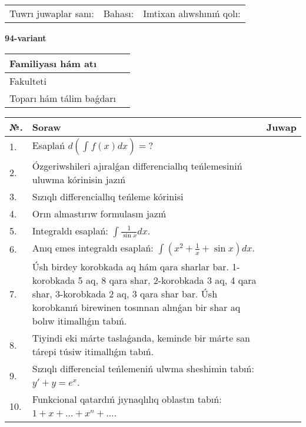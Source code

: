 \documentclass{article}
\begin{document}
\vspace{1cm}

\begin{tabular}{ c c c }
Tuwrı juwaplar sanı: \underline{\hspace{2cm}} & Bahası: \underline{\hspace{2cm}} & Imtixan alıwshınıń qolı: \underline{\hspace{2cm}} \\
\end{tabular}

\newpage

\begin{center}\textbf{94-variant}\end{center}

\bgroup
\def\arraystretch{1.5}
\begin{tabular}{ |m{6cm}|m{10cm}| }
  \hline
  Familiyası hám atı & \\
  \hline
  Fakulteti &\\
  \hline
  Toparı hám tálim baǵdarı & \\
  \hline
\end{tabular}
\egroup

\vspace{0.5cm}

\bgroup
\def\arraystretch{2}
\begin{tabular}{ |l|m{8cm}|m{7cm}| }
  \hline
  №. & Soraw & Juwap \\
  \hline
  1. & Esaplań $\displaystyle d\left( \int_{}^{}{f(x)dx} \right) = ?$ &  \\
  \hline
  2. & Ózgeriwshileri ajıralǵan differenciallıq teńlemesiniń uluwma kórinisin jazıń &  \\
  \hline
  3. & Sızıqlı differenciallıq teńleme kórinisi &  \\
  \hline
  4. & Orın almastırıw formulasın jazıń &  \\
  \hline
  5. & Integraldı esaplań: $\displaystyle\int {\frac{1}{\sin x}dx} $. &  \\
  \hline
  6. & Anıq emes integraldı esaplań: $\displaystyle\int(x^{2}+\frac{1}{x} + \sin x)dx$. &  \\
  \hline
  7. & Úsh birdey korobkada aq hám qara sharlar bar. 1-korobkada 5 aq, 8 qara shar, 2-korobkada 3 aq, 4 qara shar, 3-korobkada 2 aq, 3 qara shar bar. Úsh korobkanıń birewinen tosınnan alınǵan bir shar aq bolıw itimallıǵın tabıń. &  \\
  \hline
  8. & Tiyindi eki márte taslaǵanda, keminde bir márte san tárepi túsiw itimallıǵın tabıń. &  \\
  \hline
  9. & Sızıqlı differencial teńlemeniń ulwma sheshimin tabıń: $y' + y =e^{x}$. &  \\
  \hline
  10. & Funkcional qatardıń jıynaqlılıq oblastın tabıń: $1 + x + \ldots + x^{n} + \ldots$. &  \\
  \hline
\end{tabular}
\egroup
\end{document}
